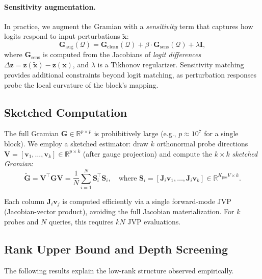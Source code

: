 \documentclass{article}
\newcommand{\R}{\mathbb{R}}
\newcommand{\cQ}{\mathcal{Q}}
\newcommand{\bz}{\mathbf{z}}
\newcommand{\bx}{\mathbf{x}}
\newcommand{\bJ}{\mathbf{J}}
\newcommand{\bG}{\mathbf{G}}
\newcommand{\bV}{\mathbf{V}}
\newcommand{\bI}{\mathbf{I}}
\begin{document}
\paragraph{Sensitivity augmentation.}
In practice, we augment the Gramian with a \emph{sensitivity} term that captures how logits respond to input perturbations $\tilde{\bx}$:
\begin{equation}\label{eq:aug-gramian}
    \bG_{\text{aug}}(\cQ) = \bG_{\text{clean}}(\cQ) + \beta \cdot \bG_{\text{sens}}(\cQ) + \lambda \bI,
\end{equation}
where $\bG_{\text{sens}}$ is computed from the Jacobians of \emph{logit differences} $\Delta\bz = \bz(\tilde{\bx}) - \bz(\bx)$, and $\lambda$ is a Tikhonov regularizer. Sensitivity matching provides additional constraints beyond logit matching, as perturbation responses probe the local curvature of the block's mapping.

\subsection{Sketched Computation}
\label{sec:sketched}

The full Gramian $\bG \in \R^{p \times p}$ is prohibitively large (e.g., $p \approx 10^7$ for a single block). We employ a sketched estimator: draw $k$ orthonormal probe directions $\bV = [\mathbf{v}_1, \ldots, \mathbf{v}_k] \in \R^{p \times k}$ (after gauge projection) and compute the $k \times k$ \emph{sketched Gramian}:
\begin{equation}\label{eq:sketch}
    \tilde{\bG} = \bV^\top \bG \bV = \frac{1}{N}\sum_{i=1}^{N} \mathbf{S}_i^\top \mathbf{S}_i,
    \quad \text{where } \mathbf{S}_{i} = [\bJ_i \mathbf{v}_1, \ldots, \bJ_i \mathbf{v}_k] \in \R^{K_\text{pos} V \times k}.
\end{equation}

Each column $\bJ_i \mathbf{v}_j$ is computed efficiently via a single forward-mode JVP (Jacobian-vector product), avoiding the full Jacobian materialization. For $k$ probes and $N$ queries, this requires $kN$ JVP evaluations.

\subsection{Rank Upper Bound and Depth Screening}
\label{sec:rank-bound}

The following results explain the low-rank structure observed empirically.
\end{document}
